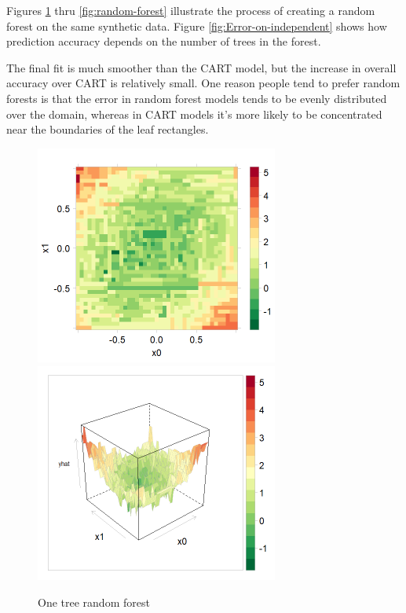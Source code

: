 \documentclass[10pt,openany]{article}
\numberwithin{definition}{section}
\numberwithin{example}{section}
\numberwithin{equation}{section}
\numberwithin{figure}{section}
\begin{document}
Figures \ref{fig:One-tree-random} thru \ref{fig:random-forest} illustrate
the process of creating a random forest on the same synthetic data.
Figure \ref{fig:Error-on-independent} shows how prediction accuracy
depends on the number of trees in the forest.

The final fit is much smoother than the CART model, but the increase
in overall accuracy over CART is relatively small. One reason people
tend to prefer random forests is that the error in random forest models
tends to be evenly distributed over the domain, whereas in CART models
it's more likely to be concentrated near the boundaries of the leaf
rectangles.

\begin{figure}[t]
\noindent \begin{centering}
\includegraphics[width=80mm]{fig/rf-1-tree-levelplot}~
\includegraphics[width=80mm]{fig/rf-1-tree-wireframe}
\par\end{centering}
\protect\caption{\label{fig:One-tree-random}One tree random forest}
\end{figure}
\end{document}
